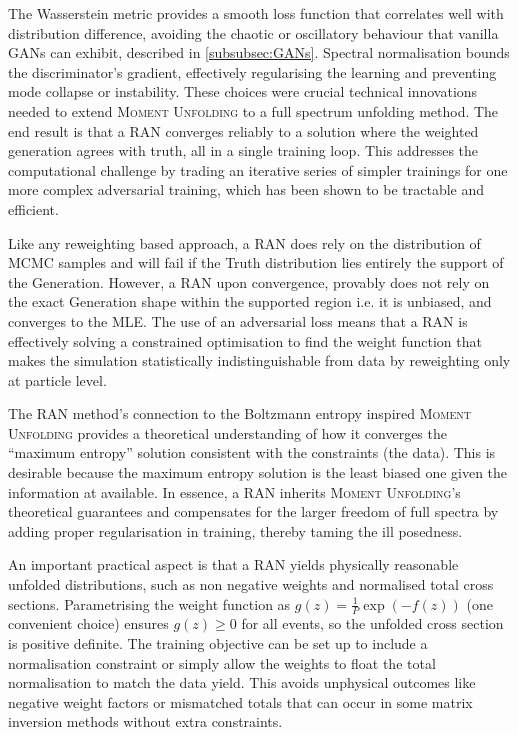 {{        The Wasserstein metric provides a smooth loss function that correlates well with distribution difference, avoiding the chaotic or oscillatory behaviour that vanilla GANs can exhibit, described in \cref{subsubsec:GANs}.
        Spectral normalisation bounds the discriminator's gradient, effectively regularising the learning and preventing mode collapse or instability.
        These choices were crucial technical innovations needed to extend \textsc{Moment Unfolding} to a full spectrum unfolding method.
        The end result is that a RAN converges reliably to a solution where the weighted generation agrees with truth, all in a single training loop.
        This addresses the computational challenge by trading an iterative series of simpler trainings for one more complex adversarial training, which has been shown to be tractable and efficient.

        Like any reweighting based approach, a RAN does rely on the distribution of MCMC samples and will fail if the Truth distribution lies entirely the support of the Generation.
        However, a RAN upon convergence, provably does not rely on the exact Generation shape within the supported region i.e. it is unbiased, and converges to the MLE.
        The use of an adversarial loss means that a RAN is effectively solving a constrained optimisation to find the weight function that makes the simulation statistically indistinguishable from data by reweighting only at particle level.
        
        The RAN method's connection to the Boltzmann entropy inspired \textsc{Moment Unfolding} provides a theoretical understanding of how it converges the ``maximum entropy'' solution consistent with the constraints (the data).
        This is desirable because the maximum entropy solution is the least biased one given the information at available.
        In essence, a RAN inherits \textsc{Moment Unfolding}'s theoretical guarantees and compensates for the larger freedom of full spectra by adding proper regularisation in training, thereby taming the ill posedness.

        An important practical aspect is that a RAN yields physically reasonable unfolded distributions, such as non negative weights and normalised total cross sections.
        Parametrising the weight function as $g({z}) = \frac1P\exp(-f({z}))$ (one convenient choice) ensures $g({z})\ge 0$ for all events, so the unfolded cross section is positive definite.
        The training objective can be set up to include a normalisation constraint or simply allow the weights to float the total normalisation to match the data yield.
        This avoids unphysical outcomes like negative weight factors or mismatched totals that can occur in some matrix inversion methods without extra constraints.
        
}}
